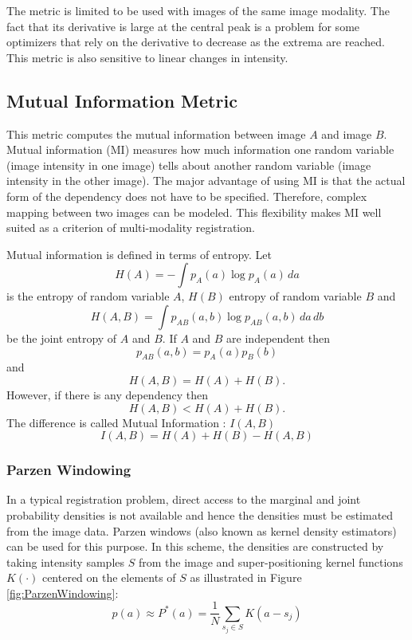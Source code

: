The metric is limited to be used with images of the same image modality.  The
fact that its derivative is large at the central peak is a problem for some
optimizers that rely on the derivative to decrease as the extrema are reached.
This metric is also sensitive to linear changes in intensity.


\subsection{Mutual Information Metric}
\label{sec:MutualInformationMetric}
This metric computes the mutual information between image $A$ and image $B$.
Mutual information (MI) measures how much information one random variable
(image intensity in one image) tells about another random variable 
(image intensity in the other image). The major advantage of using
MI is that the actual form of the dependency does not have to be specified. 
Therefore, complex mapping between two images can be modeled. 
This flexibility makes MI well suited as a criterion of multi-modality
registration.

Mutual information is defined in terms of entropy. Let
\begin{equation}
H(A) = - \int p_A(a) \log p_A(a)\, da
\end{equation}
is the entropy of random variable $A$, $H(B)$ entropy of 
random variable $B$ and 
\begin{equation}
H(A,B) = \int p_{AB}(a,b) \log p_{AB}(a,b)\,da\,db
\end{equation}
be the joint entropy of $A$ and $B$. If $A$ and $B$ are independent then
\begin{equation}
p_{AB}(a,b) = p_A(a) p_B(b)
\end{equation}
and
\begin{equation}
H(A,B) = H(A) + H(B).
\end{equation}
However, if there is any dependency then
\begin{equation}
H(A,B)<H(A)+H(B).
\end{equation}
The difference is called Mutual Information : \( I(A,B) \)
\begin{equation}
I(A,B)=H(A)+H(B)-H(A,B)
\end{equation}

\subsubsection{Parzen Windowing}
In a typical registration problem, direct access to the marginal 
and joint probability densities is not available and hence the
densities must be estimated from the image data. Parzen windows 
(also known as kernel density estimators) can be used for this purpose.
In this scheme, the densities are constructed by taking intensity 
samples $S$ from the image and super-positioning kernel functions 
$K(\cdot)$ centered on the elements of $S$ as illustrated in
Figure \ref{fig:ParzenWindowing}:
\begin{equation}
p(a) \approx P^{*}(a) = \frac{1}{N} \sum_{s_j \in S} K\left(a - s_j\right)
\end{equation}

